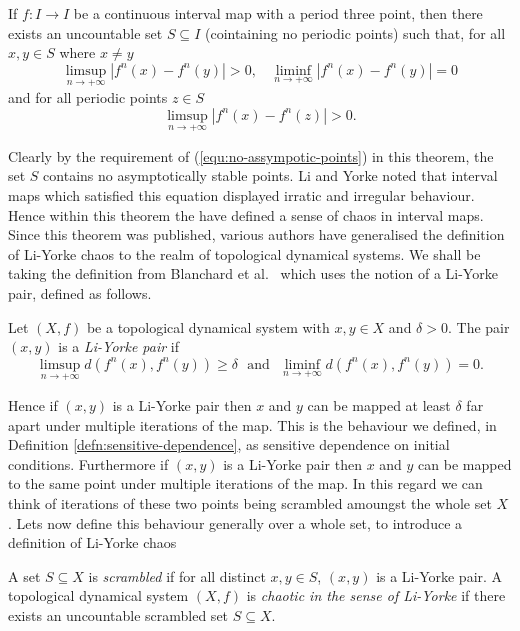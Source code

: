 \begin{thm} \label{thm:li-yorke-chaos-intervals}
    If $f: I \to I$ be a continuous interval map with a period three point, then there exists an uncountable set $S \subseteq I$ (cointaining no periodic points) such that, for all $x, y \in S$ where $x \neq y$
    \[\limsup_{n \to +\infty}\left\lvert f^n(x) - f^n(y) \right\rvert > 0, \ \ \ \ \liminf_{n \to +\infty}\left\lvert f^n(x) - f^n(y) \right\rvert = 0\] and for all periodic points $z \in S$ \begin{equation} \label{equ:no-assympotic-points}\limsup_{n \to +\infty}\left\lvert f^n(x) - f^n(z) \right\rvert > 0.\end{equation}
\end{thm}

Clearly by the requirement of (\ref{equ:no-assympotic-points}) in this theorem, the set $S$ contains no asymptotically stable points. Li and Yorke noted that interval maps which satisfied this equation displayed irratic and irregular behaviour. Hence within this theorem the have defined a sense of chaos in interval maps. Since this theorem was published, various authors have generalised the definition of Li-Yorke chaos to the realm of topological dynamical systems. We shall be taking the definition from Blanchard et al.\ \cite{bgsm} which uses the notion of a Li-Yorke pair, defined as follows.

\begin{defn} \label{defn:li-yorke-pair}
    Let $(X, f)$ be a topological dynamical system with $x, y \in X$ and $\delta > 0$. The pair $(x, y)$ is a \emph{Li-Yorke pair} if \[\limsup_{n \to +\infty} d\left( f^n(x), f^n(y) \right) \geq \delta \ \ \ \text{and} \ \ \ \liminf_{n\to+\infty} d\left( f^n(x), f^n(y) \right) = 0.\]
\end{defn}

Hence if $(x, y)$ is a Li-Yorke pair then $x$ and $y$ can be mapped at least $\delta$ far apart under multiple iterations of the map. This is the behaviour we defined, in Definition \ref{defn:sensitive-dependence}, as sensitive dependence on initial conditions. Furthermore if $(x, y)$ is a Li-Yorke pair then $x$ and $y$ can be mapped to the same point under multiple iterations of the map. In this regard we can think of iterations of these two points being scrambled amoungst the whole set $X$. Lets now define this behaviour generally over a whole set, to introduce a definition of Li-Yorke chaos

\begin{defn}  \label{defn:scrambled-set}
    A set $S \subseteq X$ is \emph{scrambled} if for all distinct $x, y \in S$, $(x, y)$ is a Li-Yorke pair. A topological dynamical system $(X, f)$ is \emph{chaotic in the sense of Li-Yorke} if there exists an uncountable scrambled set $S \subseteq X$.
\end{defn}


